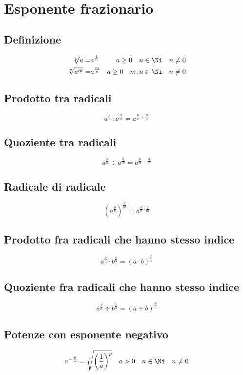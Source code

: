 \chapter{Esponente frazionario}
\section{Definizione}
\begin{align}
\sqrt[n]{a}=&a^{\frac{1}{n}}&a\geq 0\quad n\in\Ni
\quad n\neq 0\\
\sqrt[n]{a^m}=&a^{\frac{m}{n}}&a\geq 0\quad m,n\in\Ni
\quad n\neq 0
\end{align}
\section{Prodotto tra radicali}
\begin{equation}
a^{\frac{p}{n}}\cdot a^{\frac{q}{m}}=a^{\frac{p}{n}+\frac{q}{m}}
\end{equation}
\section{Quoziente tra radicali}
\begin{equation}
a^{\frac{p}{n}}\div a^{\frac{q}{m}}=a^{\frac{p}{n}-\frac{q}{m}}
\end{equation}
\section{Radicale di radicale}
\begin{equation}
\left(a^{\frac{p}{n}}\right)^{\frac{q}{m}}=a^{\frac{p}{n}\cdot\frac{q}{m}}
\end{equation}
\section{Prodotto fra radicali che hanno stesso indice}
\begin{equation}
a^{\frac{p}{n}}\cdot b^{\frac{p}{n}}=\left(a\cdot b\right)^{\frac{p}{n}}
\end{equation}
\section{Quoziente fra radicali che hanno stesso indice}
\begin{equation}
a^{\frac{p}{n}}\div b^{\frac{p}{n}}=\left(a\div b\right)^{\frac{p}{n}}
\end{equation}
\section{Potenze con esponente negativo}
\begin{equation}
a^{-\frac{p}{n}}=\sqrt[b]{\left(\dfrac{1}{a}\right)^p}\quad a>0\quad n\in\Ni
\quad n\neq 0
\end{equation}
